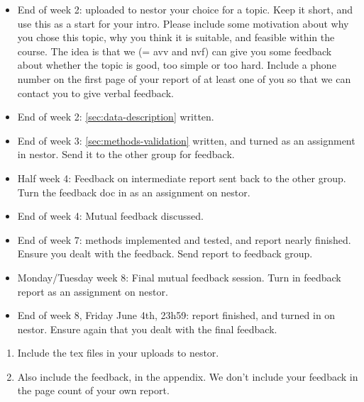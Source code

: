 \documentclass[report]{subfiles}
\begin{document}
\begin{itemize}
\item End of week 2: uploaded to nestor your choice for a topic.
  Keep it short, and use this as a start for your intro.
  Please include some motivation about why you chose this topic, why you think it is suitable, and feasible within the course.
  The idea is that we (= avv and nvf) can give you some feedback about whether the topic is good, too simple or too hard.
  Include a phone number on the first page of your report of at least one of you so that we can contact you to give verbal feedback.
\item End of week 2: \cref{sec:data-description} written.
\item End of week 3: \cref{sec:methods-validation} written, and turned as an assignment in nestor.
  Send it to the other group for feedback.
\item Half week 4: Feedback on intermediate report sent back to the other group.
  Turn the feedback doc in as an assignment on nestor.
\item End of week 4:   Mutual feedback discussed.
\item End of week 7: methods implemented and tested, and report nearly finished.
  Ensure you dealt with the feedback.
  Send report to feedback group.
\item Monday/Tuesday week 8: Final mutual feedback session. Turn in feedback  report as an assignment on nestor.
\item End of week 8, Friday June 4th, 23h59: report finished, and turned in on nestor.
  Ensure again that you dealt with the final feedback.
\end{itemize}

\begin{enumerate}
\item Include the tex files in your uploads to nestor.
\item Also include the feedback, in the appendix.  We don't include your feedback in the page count of your own report.
\end{enumerate}
\end{document}
